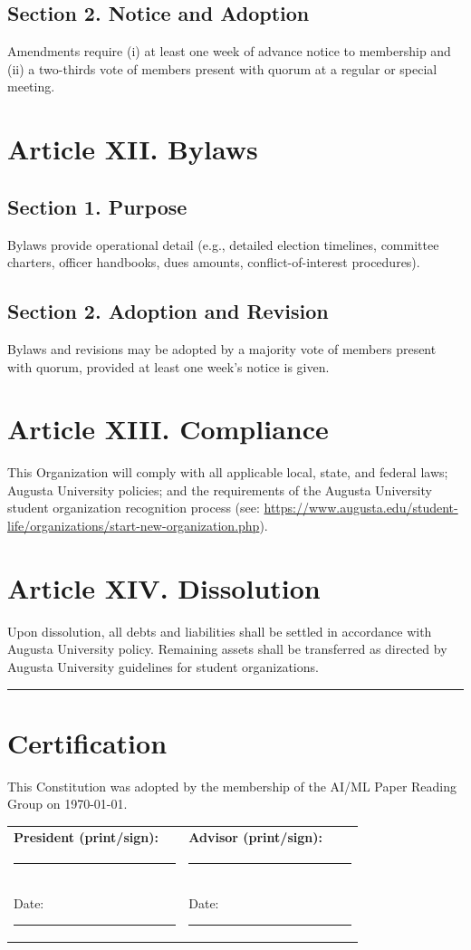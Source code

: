 \documentclass[12pt]{article}
\newcommand{\orgname}{AI/ML Paper Reading Group} %
\newcommand{\university}{Augusta University}
\newcommand{\foundingdate}{\today}               %
\begin{document}
\subsection*{Section 2. Notice and Adoption}
Amendments require (i) at least one week of advance notice to membership and (ii) a two-thirds vote of members present with quorum at a regular or special meeting.

\section*{Article XII. Bylaws}
\subsection*{Section 1. Purpose}
Bylaws provide operational detail (e.g., detailed election timelines, committee charters, officer handbooks, dues amounts, conflict-of-interest procedures).

\subsection*{Section 2. Adoption and Revision}
Bylaws and revisions may be adopted by a majority vote of members present with quorum, provided at least one week’s notice is given.

\section*{Article XIII. Compliance}
This Organization will comply with all applicable local, state, and federal laws; \university{} policies; and the requirements of the \university{} student organization recognition process (see: \url{https://www.augusta.edu/student-life/organizations/start-new-organization.php}).

\section*{Article XIV. Dissolution}
Upon dissolution, all debts and liabilities shall be settled in accordance with \university{} policy. Remaining assets shall be transferred as directed by \university{} guidelines for student organizations.

\vspace{1em}
\noindent\rule{\textwidth}{0.4pt}

\section*{Certification}
This Constitution was adopted by the membership of the \orgname{} on \foundingdate.

\vspace{2em}
\noindent\begin{tabular}{@{}p{0.45\linewidth}p{0.45\linewidth}}
\textbf{President (print/sign):} & \textbf{Advisor (print/sign):} \\
\rule{0.9\linewidth}{0.4pt} & \rule{0.9\linewidth}{0.4pt} \\
Date: \rule{0.75\linewidth}{0.4pt} & Date: \rule{0.75\linewidth}{0.4pt} \\
\end{tabular}
\end{document}
